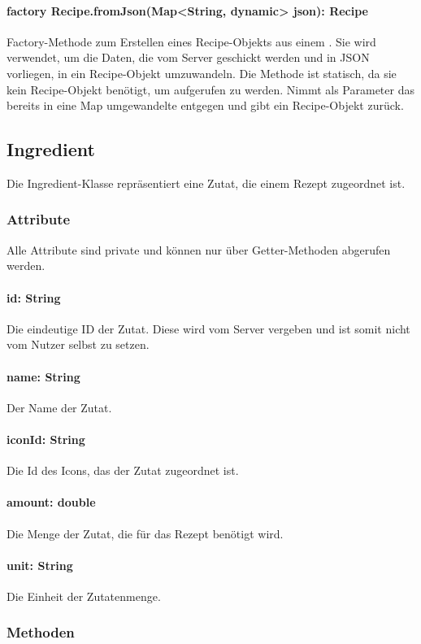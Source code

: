 \documentclass[parskip=full]{scrartcl}
\begin{document}
\paragraph{factory Recipe.fromJson(Map<String, dynamic> json): Recipe}
Factory-Methode zum Erstellen eines Recipe-Objekts aus einem . Sie wird verwendet, um die Daten, die vom Server geschickt werden und in \Gls{JSON} vorliegen, in ein Recipe-Objekt umzuwandeln. Die Methode ist statisch, da sie kein Recipe-Objekt benötigt, um aufgerufen zu werden. Nimmt als Parameter das bereits in eine Map umgewandelte  entgegen und gibt ein Recipe-Objekt zurück.

\newpage
\subsection{Ingredient}
Die Ingredient-Klasse repräsentiert eine Zutat, die einem Rezept zugeordnet ist.
\subsubsection*{Attribute}
Alle Attribute sind private und können nur über Getter-Methoden abgerufen werden.
\paragraph{id: String}
Die eindeutige ID der Zutat. Diese wird vom Server vergeben und ist somit nicht vom Nutzer selbst zu setzen.
\paragraph{name: String}
Der Name der Zutat.
\paragraph{iconId: String}
Die Id des Icons, das der Zutat zugeordnet ist.
\paragraph{amount: double}
Die Menge der Zutat, die für das Rezept benötigt wird.
\paragraph{unit: String}
Die Einheit der Zutatenmenge.

\subsubsection*{Methoden}
\end{document}
